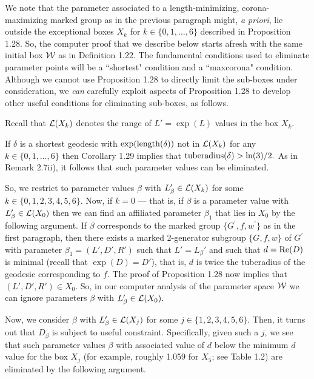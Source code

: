 We note that the parameter associated to
a length-minimizing, corona-maximizing marked
group as in the previous paragraph might, {\it a priori}, lie outside
the exceptional boxes 
$X_k$ for $k\in \{0,1,\ldots, 6\}$ described in Proposition 1.28.
So, the computer proof that we describe below starts afresh with
the same initial box ${\cal W}$ as in Definition 1.22.
The fundamental conditions  used to eliminate
parameter points will be a ``shortest" condition and
a ``maxcorona" condition.
Although we cannot use Proposition 1.28 to directly limit the
sub-boxes under consideration, we {\it can} carefully exploit
aspects of Proposition 1.28 to develop other useful conditions
for eliminating sub-boxes, as follows.

Recall that ${\cal L}(X_k)$ denotes the range
of $L'=\exp(L)$ values in the box $X_k.$

If $\delta$ is a shortest geodesic with
$\exp({\rm length}(\delta))$ not in ${\cal L}(X_k)$ for any $k\in
\{0,1,\ldots, 6\}$ then
Corollary 1.29 implies that ${\rm tuberadius}(\delta) > \ln(3)/2.$
As in Remark 2.7ii), it follows that
such parameter values can be eliminated.

So, we restrict to parameter values $\beta$ with
$L_\beta'\in {\cal L}(X_k)$ for some $k\in
\{0,1,2,3,4,5,6\}.$  Now, if $k=0$ --- that is, if $\beta$ is
a parameter value with $L_\beta'\in {\cal L}(X_0)$ then we
can  find an affiliated parameter
$\beta_1$ that
lies in $X_0$
by the following argument.   If $\beta$ corresponds to the
marked group $\{G^\prime,f,w^\prime\}$ as in the first
paragraph, then there exists a marked 2-generator subgroup
$\{G,f,w\}$ of
$G^\prime$ with parameter $\beta_1=(L',D',R')$ such that $L'=L_\beta'$ and
such that
$d={\rm Re}(D)$ is minimal (recall that $\exp(D)=D'$),
that is,  $d$ is twice the tuberadius of the geodesic corresponding
to $f$. The proof of
Proposition 1.28 now implies that
$(L',D',R')\in X_0$.  So, in our computer
analysis of the parameter space ${\cal W}$ we can ignore parameters
$\beta$ with $L_\beta'\in {\cal L}(X_0).$

Now, we consider
$\beta$ with $L_\beta'\in {\cal L}(X_j)$ for some
$j\in\{1,2,3,4,5,6\}.$
Then, it turns out that  $D_\beta$ is subject to useful constraint.
Specifically,  given such a $j$,
we see that such parameter values
$\beta$ with associated value of $d$ below
the minimum $d$ value for the box $X_j$
(for example, roughly 1.059 for $X_5$; see Table 1.2)
are eliminated by the following argument.


